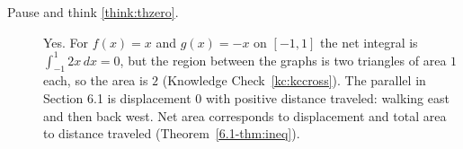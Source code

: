 \documentclass[11pt]{article}
\begin{document}
\begin{description}
  \item[Pause and think \ref{think:thzero}.] Yes. For $f(x)=x$ and $g(x)=-x$ on $[-1,1]$ the net integral is $\int_{-1}^1 2x\,dx=0$, but the region between the graphs is two triangles of area $1$ each, so the area is $2$ (Knowledge Check~\ref{kc:kccross}). The parallel in Section 6.1 is displacement $0$ with positive distance traveled: walking east and then back west. Net area corresponds to displacement and total area to distance traveled (Theorem~\ref{6.1-thm:ineq}).

\end{description}
\end{document}
